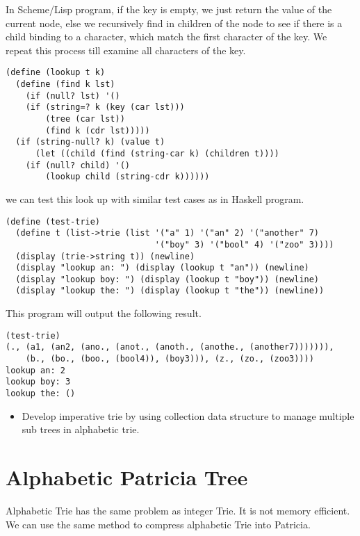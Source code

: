 \documentclass{article}
\begin{document}
In Scheme/Lisp program, if the key is empty, we just return the value
of the current node, else we recursively find in children of the node
to see if there is a child binding to a character, which match the
first character of the key. We repeat this process till examine all
characters of the key.

\lstset{language=lisp}
\begin{lstlisting}
(define (lookup t k)
  (define (find k lst)
    (if (null? lst) '()
	(if (string=? k (key (car lst)))
	    (tree (car lst))
	    (find k (cdr lst)))))
  (if (string-null? k) (value t)
      (let ((child (find (string-car k) (children t))))
	(if (null? child) '()
	    (lookup child (string-cdr k))))))
\end{lstlisting}

we can test this look up with similar test cases as in Haskell program.

\begin{lstlisting}
(define (test-trie)
  (define t (list->trie (list '("a" 1) '("an" 2) '("another" 7)
                              '("boy" 3) '("bool" 4) '("zoo" 3))))
  (display (trie->string t)) (newline)
  (display "lookup an: ") (display (lookup t "an")) (newline)
  (display "lookup boy: ") (display (lookup t "boy")) (newline)
  (display "lookup the: ") (display (lookup t "the")) (newline))
\end{lstlisting}

This program will output the following result.

\begin{lstlisting}
(test-trie)
(., (a1, (an2, (ano., (anot., (anoth., (anothe., (another7))))))),
    (b., (bo., (boo., (bool4)), (boy3))), (z., (zo., (zoo3))))
lookup an: 2
lookup boy: 3
lookup the: ()
\end{lstlisting}

\begin{Exercise}
\begin{itemize}
\item Develop imperative trie by using collection data structure to manage multiple sub trees in
alphabetic trie.
\end{itemize}
\end{Exercise}

\section{Alphabetic Patricia Tree}
Alphabetic Trie has the same problem as integer Trie. It is not memory
efficient. We can use the same method to compress alphabetic Trie into
Patricia.
\end{document}
